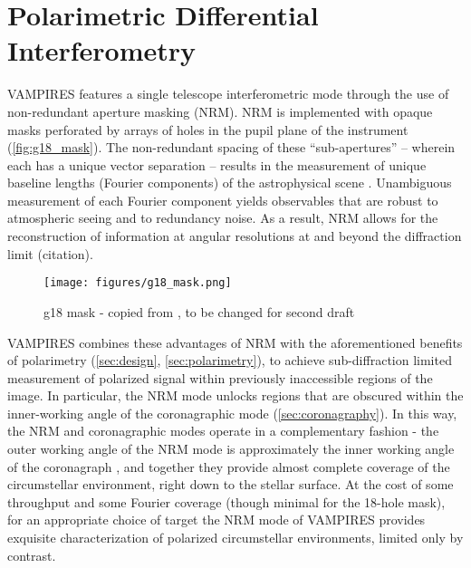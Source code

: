 \section{Polarimetric Differential Interferometry}\label{sec:interferometry}


 
 

VAMPIRES features a single telescope interferometric mode through the use of non-redundant aperture masking (NRM). NRM is implemented with opaque masks perforated by arrays of holes in the pupil plane of the instrument (\autoref{fig:g18_mask}). The non-redundant spacing of these ``sub-apertures'' -- wherein each has a unique vector separation -- results in the measurement of unique baseline lengths (Fourier components) of the astrophysical scene \citep{tuthill_aperture_2000}. Unambiguous measurement of each Fourier component yields observables that are robust to atmospheric seeing and to redundancy noise. As a result, NRM allows for the reconstruction of information at angular resolutions at and beyond the diffraction limit (citation).


\begin{figure}[h!]
\centering
\texttt{[image: figures/g18\_mask.png]}
    \caption{\label{fig:g18_mask} g18 mask - copied from \citep{norris_vampires_2015}, to be changed for second draft}
\end{figure}


VAMPIRES combines these advantages of NRM with the aforementioned benefits of polarimetry (\autoref{sec:design}, \autoref{sec:polarimetry}), to achieve sub-diffraction limited measurement of polarized signal within previously inaccessible regions of the image. In particular, the NRM mode unlocks regions that are obscured within the inner-working angle of the coronagraphic mode (\autoref{sec:coronagraphy}). In this way, the NRM and coronagraphic modes operate in a complementary fashion - the outer working angle of the NRM mode is approximately the inner working angle of the coronagraph \citep{norris_vampires_2015}, and together they provide almost complete coverage of the circumstellar environment, right down to the stellar surface. At the cost of some throughput and some Fourier coverage (though minimal for the 18-hole mask), for an appropriate choice of target the NRM mode of VAMPIRES provides exquisite characterization of polarized circumstellar environments, limited only by contrast.


